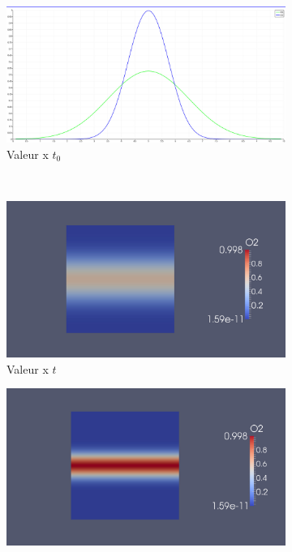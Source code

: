 
\begin{figure}[t!]
  \centering
  \begin{subfigure}[b]{0.5\textwidth}
    \centering
    \includegraphics[width=.9\linewidth]{figures/diff.png}
    \caption{\label{fig:diff_0}Valeur x $t_0$}
  \end{subfigure}%
  ~ 
  \begin{subfigure}[b]{0.5\textwidth}
    \centering
    \includegraphics[width=.9\linewidth]{figures/diff_325.png}
    \caption{\label{fig:diff_325}Valeur x $t$}
  \end{subfigure}
  \caption{Caption place holder}
  \centering
  \begin{subfigure}[b]{0.5\textwidth}
    \centering
    \includegraphics[width=.9\linewidth]{figures/diff_0.png}

\end{subfigure}
\end{figure}

